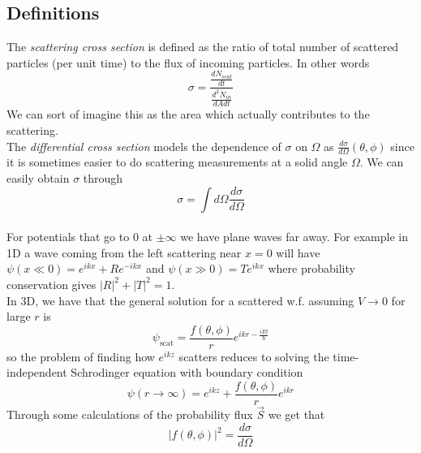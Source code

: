 \documentclass{article}
\begin{document}
\subsection{Definitions}
The \emph{scattering cross section} is defined as the ratio of total number of scattered particles (per unit time) to the flux of incoming particles. In other words $$\sigma = \frac{\frac{dN_{scat}}{dt}}{\frac{d^2N_{in}}{dAdt}}$$
We can sort of imagine this as the area which actually contributes to the scattering.\\
The \emph{differential cross section} models the dependence of $\sigma$ on $\Omega$ as $\frac{d\sigma}{d\Omega} (\theta, \phi)$ since it is sometimes easier to do scattering measurements at a solid angle $\Omega$. We can easily obtain $\sigma$ through
$$\sigma = \int d\Omega \frac{d\sigma}{d\Omega}$$\\
For potentials that go to $0$ at $\pm \infty$ we have plane waves far away. For example in 1D a wave coming from the left scattering near $x=0$ will have $\psi(x\ll 0)=e^{ikx}+Re^{-ikx}$ and $\psi(x\gg 0) =Te^{ikx}$ where probability conservation gives $|R|^2+|T|^2=1$.\\
In 3D, we have that the general solution for a scattered w.f. assuming $V\rightarrow 0$ for large $r$ is 
$$\psi_{\text{scat}}=\frac{f(\theta, \phi)}{r}e^{ikr-\frac{iEt}{\hbar}}$$
so the problem of finding how $e^{ikz}$ scatters reduces to solving the time-independent Schrodinger equation with boundary condition $$\psi(r\rightarrow \infty)=e^{ikz}+\frac{f(\theta,\phi)}{r}e^{ikr}$$
Through some calculations of the probability flux $\vec{S}$ we get that 
\begin{equation}
\boxed{
|f(\theta, \phi)|^2=\frac{d\sigma}{d\Omega}
}
\end{equation}
\end{document}

